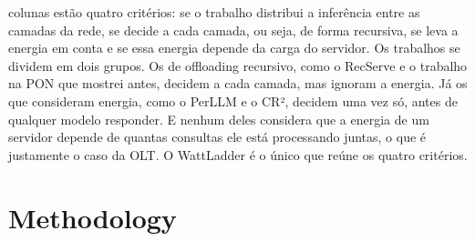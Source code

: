 \documentclass[aspectratio=169]{beamer}
\begin{document}
\begin{frame}
{    colunas estão quatro critérios: se o trabalho distribui a inferência entre as
    camadas da rede, se decide a cada camada, ou seja, de forma recursiva, se
    leva a energia em conta e se essa energia depende da carga do servidor. Os trabalhos se dividem em dois grupos. Os de
    offloading recursivo, como o RecServe e o trabalho na PON que mostrei antes,
    decidem a cada camada, mas ignoram a energia. Já os que consideram energia,
    como o PerLLM e o CR², decidem uma vez só, antes de qualquer modelo
    responder. E nenhum deles considera que a energia de um servidor depende de
    quantas consultas ele está processando juntas, o que é justamente o caso da
    OLT. O WattLadder é o único que reúne os quatro critérios.}
\end{frame}

\section{Methodology}
\end{document}
